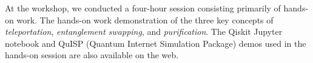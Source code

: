 At the workshop, we conducted a four-hour session consisting primarily of hands-on work.  The hands-on work demonstration of the three key concepts of \emph{teleportation}, \emph{entanglement swapping}, and \emph{purification}. The Qiskit Jupyter notebook and QuISP (Quantum Internet Simulation Package) demos used in the hands-on session are also available on the web. 
